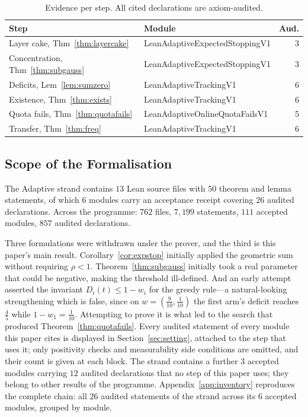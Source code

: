 \documentclass[conference]{IEEEtran}
\theoremstyle{definition}
\newcommand{\lean}[1]{\textsf{\footnotesize #1}}
\begin{document}
\begin{table}[htbp]
\caption{Evidence per step. All cited declarations are axiom-audited.}
\label{tab:inventory}
\centering\footnotesize\setlength{\tabcolsep}{3pt}
\begin{tabular}{@{}llr@{}}
\toprule
Step & Module & Aud. \\
\midrule
Layer cake, Thm~\ref{thm:layercake}   & \lean{LeanAdaptiveExpectedStoppingV1}  & 3 \\
Concentration, Thm~\ref{thm:subgauss} & \lean{LeanAdaptiveExpectedStoppingV1}  & 3 \\
Deficits, Lem~\ref{lem:sumzero}       & \lean{LeanAdaptiveTrackingV1}          & 6 \\
Existence, Thm~\ref{thm:exists}       & \lean{LeanAdaptiveTrackingV1}          & 6 \\
Quota fails, Thm~\ref{thm:quotafails} & \lean{LeanAdaptiveOnlineQuotaFailsV1}  & 5 \\
Transfer, Thm~\ref{thm:freq}          & \lean{LeanAdaptiveTrackingV1}          & 6 \\
\bottomrule
\end{tabular}
\end{table}

\subsection{Scope of the Formalisation}

The Adaptive strand contains $13$ Lean source files with $50$ theorem and lemma statements,
of which $6$ modules carry an acceptance receipt covering $26$ audited declarations. Across the
programme: $762$ files, $7{,}199$ statements, $111$ accepted modules, $857$ audited
declarations.

Three formulations were withdrawn under the prover, and the third is this paper's main result.
Corollary~\ref{cor:expstop} initially applied the geometric sum without requiring $\rho<1$.
Theorem~\ref{thm:subgauss} initially took a real parameter that could be negative, making the
threshold ill-defined. And an early attempt asserted the invariant $D_{i}(t)\le1-w_{i}$ for the
greedy rule---a natural-looking strengthening which is false, since on
$w=(\tfrac{9}{10},\tfrac{1}{10})$ the first arm's deficit reaches $\tfrac45$ while
$1-w_{1}=\tfrac{1}{10}$. Attempting to prove it is what led to the search that produced
Theorem~\ref{thm:quotafails}. Every audited statement of every module this paper cites is displayed in Section~\ref{sec:setting}, attached to the step that uses it; only positivity checks and measurability side conditions are omitted, and their count is given at each block. The strand contains a further $3$ accepted modules carrying $12$ audited declarations that no step of this paper uses; they belong to other results of the programme. Appendix~\ref{app:inventory} reproduces the complete chain: all $26$ audited statements of the strand across its $6$ accepted modules, grouped by module.
\end{document}
